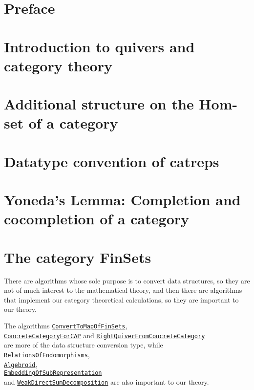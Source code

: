 \documentclass{article}
\begin{document}
\tableofcontents\label{toc}
\section{Preface}

\section{Introduction to quivers and category theory}


\section{Additional structure on the Hom-set of a category}


\section{Datatype convention of catreps}


\section{Yoneda's Lemma: Completion and cocompletion of a category}


\section{The category FinSets}

There are algorithms whose sole purpose is to convert data structures, so they are not of much interest to the mathematical theory,
and then there are algorithms that implement our category theoretical calculations, so they are important to our theory.

The algorithms \hyperref[func:ConvertToMapOfFinSets]{\texttt{ConvertToMapOfFinSets}},\\
\hyperref[func:ConcreteCategoryForCAP]{\texttt{ConcreteCategoryForCAP}} and
\hyperref[func:RightQuiverFromConcreteCategory]{\texttt{RightQuiverFromConcreteCategory}}\\
are more of the data structure conversion type, while 
\hyperref[func:RelationsOfEndomorphisms]{\texttt{RelationsOfEndomorphisms}},\\
\hyperref[func:Algebroid]{\texttt{Algebroid}},\\
\hyperref[func:EmbeddingOfSubRepresentation]{\texttt{EmbeddingOfSubRepresentation}}\\
and \hyperref[func:WeakDirectSumDecomposition]{\texttt{WeakDirectSumDecomposition}} are also important to our theory.
\end{document}

